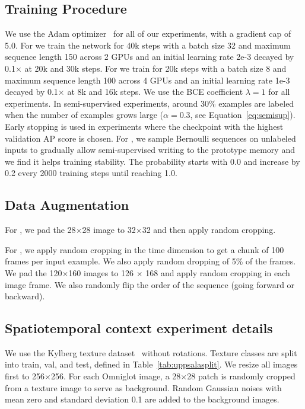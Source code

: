 \subsection{Training Procedure}
We use the Adam optimizer~\citep{adam} for all of our experiments, with a gradient cap of 5.0. For
\ourchar{} we train the network for 40k steps with a batch size 32 and maximum sequence length 150
across 2 GPUs and an initial learning rate 2e-3 decayed by 0.1$\times$ at 20k and 30k steps. For
\ourroom{} we train for 20k steps with a batch size 8 and maximum sequence length 100 across 4 GPUs
and an initial learning rate 1e-3 decayed by 0.1$\times$ at 8k and 16k steps. We use the BCE coefficient
$\lambda=1$  for all experiments. In semi-supervised experiments, around 30\% examples are labeled when the number of examples grows large ($\alpha = 0.3$, see Equation~\ref{eq:semisup}). Early stopping is used in \ourroom{} experiments
where the checkpoint with the highest validation AP score is chosen.
For \ourroom{}, we sample Bernoulli sequences on unlabeled inputs to 
gradually allow semi-supervised writing to the prototype memory and we find it helps training stability. The probability starts with 0.0 and increase by 0.2 every 2000 training steps until reaching 1.0.

\subsection{Data Augmentation}
For \ourchar{}, we pad the 28$\times$28 image to 32$\times$32 and then apply random cropping.

For \ourroom{}, we apply random cropping in the time dimension to get a chunk of 100 frames per
input example. We also apply random dropping of 5\% of the frames. We pad the 120$\times$160 images
to 126 $\times$ 168 and apply random cropping in each image frame. We also randomly flip the order
of the sequence (going forward or backward).


\subsection{Spatiotemporal context experiment details}
We use the Kylberg texture dataset~\citep{uppsala} without rotations. Texture classes are split into train, val, and test, defined in Table~\ref{tab:uppsalasplit}. We resize all images first to 256$\times$256. For each Omniglot image, a 28$\times$28 patch is randomly cropped from a texture image to serve as background. Random Gaussian noises with mean zero and standard deviation 0.1 are added to the background images.

